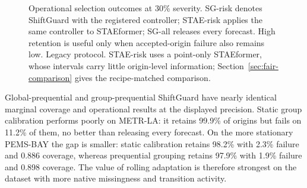 \documentclass[preprint,12pt]{elsarticle}
\begin{document}
\begin{figure}[t]
  \centering
  \caption{Operational selection outcomes at 30\% severity. SG-risk denotes
  ShiftGuard with the registered controller; STAE-risk applies the same
  controller to STAEformer; SG-all releases every forecast. High retention is
  useful only when accepted-origin failure also remains low.
  Legacy protocol. STAE-risk uses a point-only STAEformer, whose intervals carry
  little origin-level information; Section~\ref{sec:fair-comparison} gives the
  recipe-matched comparison.}
  \label{fig:selection-outcomes}
\end{figure}

Global-prequential and group-prequential ShiftGuard have nearly identical
marginal coverage and operational results at the displayed precision. Static
group calibration performs poorly on METR-LA: it retains 99.9\% of origins but
fails on 11.2\% of them, no better than releasing every forecast. On the more
stationary PEMS-BAY the gap is smaller: static calibration retains 98.2\% with
2.3\% failure and 0.886 coverage, whereas prequential grouping retains 97.9\%
with 1.9\% failure and 0.898 coverage. The value of rolling adaptation is
therefore strongest on the dataset with more native missingness and transition
activity.
\end{document}
